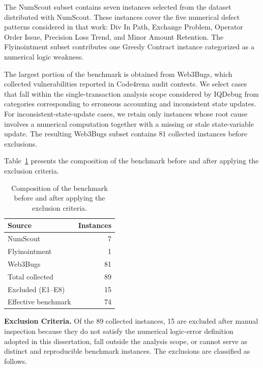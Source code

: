 \documentclass[11pt,oneside]{report}
\theoremstyle{plain}
\theoremstyle{definition}
\theoremstyle{remark}
\begin{document}
The NumScout subset contains seven instances selected from the dataset distributed with NumScout.
These instances cover the five numerical defect patterns considered in that work: Div In Path, Exchange Problem, Operator Order Issue, Precision Loss Trend, and Minor Amount Retention.
The Flyinointment subset contributes one Greedy Contract instance categorized as a numerical logic weakness.

The largest portion of the benchmark is obtained from Web3Bugs, which collected vulnerabilities reported in Code4rena audit contests.
We select cases that fall within the single-transaction analysis scope considered by IQDebug from categories corresponding to erroneous accounting and inconsistent state updates.
For inconsistent-state-update cases, we retain only instances whose root cause involves a numerical computation together with a missing or stale state-variable update.
The resulting Web3Bugs subset contains 81 collected instances before exclusions.

Table~\ref{tab:eval:dataset} presents the composition of the benchmark before and after applying the exclusion criteria.

\begin{table}[t]
\centering
\caption{Composition of the benchmark before and after applying the exclusion criteria.}
\label{tab:eval:dataset}
\footnotesize
\begin{tabular}{@{}p{}r@{}}
\toprule
Source & Instances \\
\midrule
NumScout~\citep{numscout}             & 7  \\
Flyinointment~\citep{flyinointment}   & 1  \\
Web3Bugs~\citep{exploitablebugs}      & 81 \\
\midrule
Total collected                       & 89 \\
Excluded (E1--E8)                     & 15 \\
\midrule
Effective benchmark                   & 74 \\
\bottomrule
\end{tabular}
\end{table}

\smallskip
\noindent\textbf{Exclusion Criteria.}
Of the 89 collected instances, 15 are excluded after manual inspection because they do not satisfy the numerical logic-error definition adopted in this dissertation, fall outside the analysis scope, or cannot serve as distinct and reproducible benchmark instances.
The exclusions are classified as follows.
\end{document}
